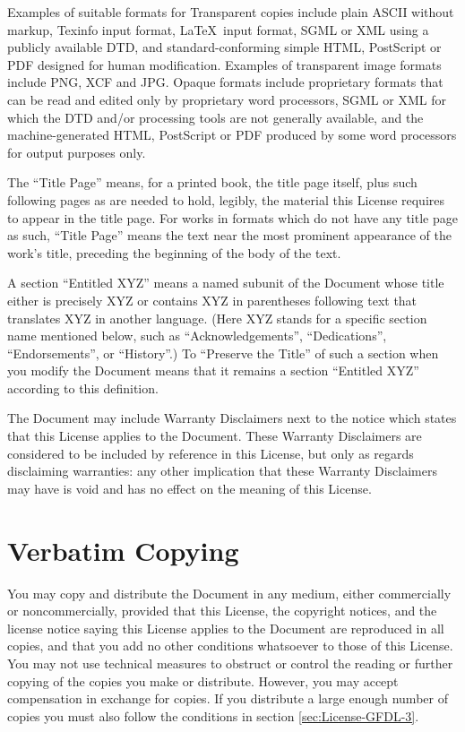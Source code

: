 Examples of suitable formats for Transparent copies include plain
ASCII without markup, Texinfo input format, \LaTeX\ input format, SGML
or XML using a publicly available DTD, and standard-conforming simple
HTML, PostScript or PDF designed for human modification.  Examples of
transparent image formats include PNG, XCF and JPG.  Opaque formats
include proprietary formats that can be read and edited only by
proprietary word processors, SGML or XML for which the DTD and/or
processing tools are not generally available, and the
machine-generated HTML, PostScript or PDF produced by some word
processors for output purposes only.

The ``Title Page'' means, for a printed book, the title page itself,
plus such following pages as are needed to hold, legibly, the material
this License requires to appear in the title page.  For works in
formats which do not have any title page as such, ``Title Page'' means
the text near the most prominent appearance of the work's title,
preceding the beginning of the body of the text.

A section ``Entitled XYZ'' means a named subunit of the Document whose
title either is precisely XYZ or contains XYZ in parentheses following
text that translates XYZ in another language.  (Here XYZ stands for a
specific section name mentioned below, such as ``Acknowledgements'',
``Dedications'', ``Endorsements'', or ``History''.) To ``Preserve the
Title'' of such a section when you modify the Document means that it
remains a section ``Entitled XYZ'' according to this definition.

The Document may include Warranty Disclaimers next to the notice which
states that this License applies to the Document.  These Warranty
Disclaimers are considered to be included by reference in this
License, but only as regards disclaiming warranties: any other
implication that these Warranty Disclaimers may have is void and has
no effect on the meaning of this License.

\section{Verbatim Copying}
\label{sec:License-GFDL-2}

You may copy and distribute the Document in any medium, either
commercially or noncommercially, provided that this License, the
copyright notices, and the license notice saying this License applies
to the Document are reproduced in all copies, and that you add no
other conditions whatsoever to those of this License.  You may not use
technical measures to obstruct or control the reading or further
copying of the copies you make or distribute.  However, you may accept
compensation in exchange for copies.  If you distribute a large enough
number of copies you must also follow the conditions in section
\ref{sec:License-GFDL-3}.

